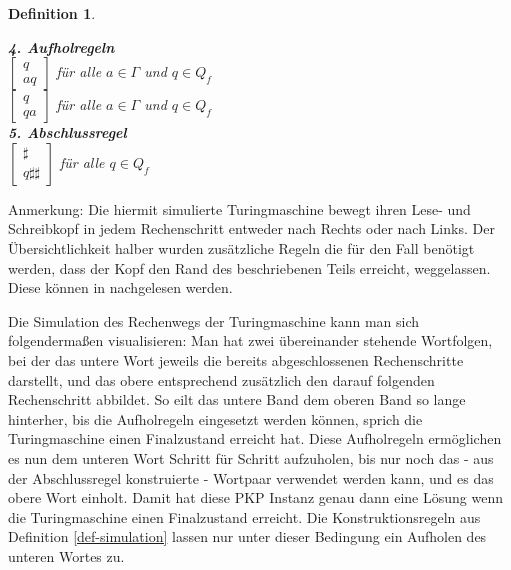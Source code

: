 \documentclass[]{scrartcl}
\newtheorem{definition}{Definition}[section]
\begin{document}
\begin{definition}
\begin{tabbing}
						\textbf{4. Aufholregeln}\\
							\> \textbullet$\begin{bmatrix} q \\ aq \end{bmatrix}$ \> für alle $a \in \varGamma$ und $q \in Q_f$\\
							\> \textbullet$\begin{bmatrix} q \\ qa \end{bmatrix}$ \> für alle $a \in \varGamma$ und $q \in Q_f$\\
						\textbf{5. Abschlussregel}\\
							\> \textbullet$\begin{bmatrix} \sharp \\ q\sharp\sharp\end{bmatrix}$ \> für alle $q \in Q_f$

				\end{tabbing} 
			\end{definition}
			Anmerkung: Die hiermit simulierte Turingmaschine bewegt ihren Lese- und Schreibkopf in jedem Rechenschritt entweder nach Rechts oder nach Links. Der Übersichtlichkeit halber wurden zusätzliche Regeln die für den Fall benötigt werden, dass der Kopf den Rand des beschriebenen Teils erreicht, weggelassen. Diese können in \cite{wegener} nachgelesen werden.
			
			Die Simulation des Rechenwegs der Turingmaschine kann man sich folgendermaßen visualisieren: Man hat zwei übereinander stehende Wortfolgen, bei der das untere Wort jeweils die bereits abgeschlossenen Rechenschritte darstellt, und das obere entsprechend zusätzlich den darauf folgenden Rechenschritt abbildet. So eilt das untere Band dem oberen Band so lange hinterher, bis die Aufholregeln eingesetzt werden können, sprich die Turingmaschine einen Finalzustand erreicht hat. Diese Aufholregeln ermöglichen es nun dem unteren Wort Schritt für Schritt aufzuholen, bis nur noch das - aus der Abschlussregel konstruierte - Wortpaar verwendet werden kann, und es das obere Wort einholt. Damit hat diese PKP Instanz genau dann eine Lösung wenn die Turingmaschine einen Finalzustand erreicht. Die Konstruktionsregeln aus Definition \ref{def-simulation} lassen nur unter dieser Bedingung ein Aufholen des unteren Wortes zu.
			
\end{document}
